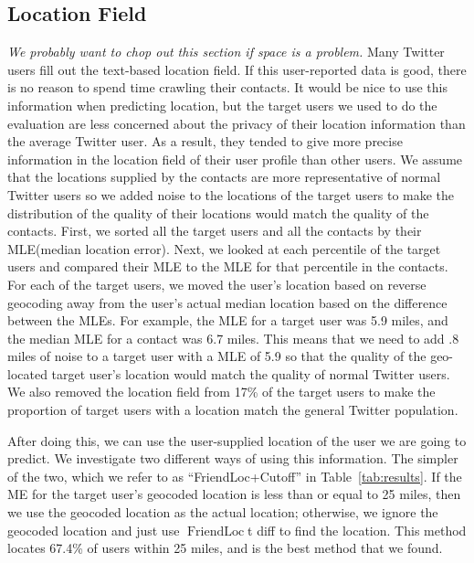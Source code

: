 \documentclass[letterpaper]{article}
\DeclareMathOperator{\FriendLoc}{FriendLoc}
\newcommand{\jam}[1]{\emph{#1}}
\begin{document}
\subsection{Location Field}
\jam{We probably want to chop out this section if space is a problem.}
Many Twitter users fill out the text-based location field.
%
If this user-reported data is good, there is no reason to spend time
crawling their contacts.
%
It would be nice to use this information when predicting location, but
the target users we used to do the evaluation are less concerned about
the privacy of their location information than the average Twitter user.
%
As a result, they tended to give more precise information in the location
field of their user profile than other users.
%
We assume that the locations supplied by the contacts are more
representative of normal Twitter users so we added noise to the locations
of the target users to make the distribution of the quality of their
locations would match the quality of the contacts.
%
First, we sorted all the target users and all the contacts by their
MLE(median location error).
%
Next, we looked at each percentile of the target users and compared
their MLE to the MLE for that percentile in the contacts.
%
For each of the target users, we moved the user's location based on
reverse geocoding away from the user's actual median location based on the
difference between the MLEs.
%
For example, the MLE for a target user was 5.9 miles, and the median
MLE for a contact was 6.7 miles.
%
This means that we need to add .8 miles of noise to a target user
with a MLE of 5.9 so that the quality of the geo-located target user's location
would match the quality of normal Twitter users.
%
We also removed the location field from 17\% of the target users to
make the proportion of target users with a location match the general
Twitter population.

After doing this, we can use the user-supplied location of the user we are
going to predict.
%
We investigate two different ways of using this information.
%
The simpler of the two, which we refer to as ``FriendLoc+Cutoff'' in
Table~\ref{tab:results}.
%
If the ME for the target user's geocoded location is less than or equal to 25
miles, then we use the geocoded location as the actual location; otherwise, we
ignore the geocoded location and just use $\FriendLoc$t diff to find the location.
%
This method locates 67.4\% of users within 25 miles, and is the best method
that we found.
\end{document}
